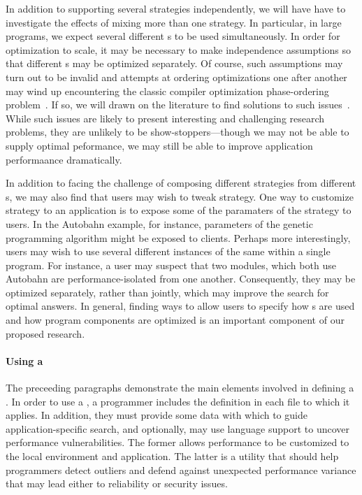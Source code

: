 In addition to supporting several strategies independently, we will have have
to investigate the effects of mixing more than one strategy.  In particular,
in large programs, we expect several different \rasp{}s to be used simultaneously.
In order for optimization to scale, it may be necessary to make independence assumptions
so that different \rasp{}s may be optimized separately.  Of course, such assumptions
may turn out to be invalid and attempts at ordering optimizations one after another
may wind up encountering the classic compiler optimization phase-ordering 
problem~\cite{Vegdahl:phase-coupling,Click:combining-optimizations}.  If so, we will drawn on the literature
to find solutions to such issues~\cite{Kulkarni:phase-ordering-search,Kulkarni:phase-ordering}.  While such issues are likely to present interesting
and challenging research problems, they are unlikely to be show-stoppers---though we may not
be able to supply optimal peformance, we may still be able to improve application performaance
dramatically.

In addition to facing the challenge of composing different strategies from different \rasp{}s, 
we may also find that users may wish to tweak \rasp{} strategy.  One way to customize \rasp{}
strategy to an application is to expose some of the paramaters of the \rasp{} strategy to users.
In the Autobahn example, for instance, parameters of the genetic programming algorithm might
be exposed to clients.  Perhaps more interestingly, users may wish to use several different 
instances of the same \rasp{} within a single program.  For instance, a user may suspect that
two modules, which both use Autobahn are performance-isolated from one another.  Consequently,
they may be optimized separately, rather than jointly, which may improve the search for
optimal answers.  In general, finding ways to allow users to specify how \rasp{}s are used and how program
components are optimized is an important component of our proposed research.

\paragraph*{Using a \rasp}
The preceeding paragraphs demonstrate the main elements involved in
defining a \rasp.  In order to use a \rasp, a programmer includes
the \rasp{} definition in each file to which it applies.  In addition, they
must provide some data with which to guide application-specific search,
and optionally, may use language support to uncover performance vulnerabilities.
The former allows performance to be customized to the local environment and application.
The latter is a utility that should help programmers detect outliers and defend against
unexpected performance variance that may lead either to reliability or security issues.

